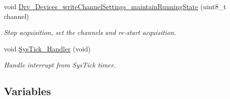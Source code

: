 \begin{DoxyCompactItemize}
void \hyperlink{group__Devices__Library_gafd94e72e2e363f075a57a091e26424b2}{Drv\+\_\+\+Devices\+\_\+write\+Channel\+Settings\+\_\+maintain\+Running\+State} (uint8\+\_\+t channel)
\begin{DoxyCompactList}\small\item\em Stop acquisition, set the channels and re-\/start acquisition. \end{DoxyCompactList}\item 
void \hyperlink{group__Devices__Library_gab5e09814056d617c521549e542639b7e}{Sys\+Tick\+\_\+\+Handler} (void)
\begin{DoxyCompactList}\small\item\em Handle interrupt from Sys\+Tick timer. \end{DoxyCompactList}\end{DoxyCompactItemize}
\subsection*{Variables}

